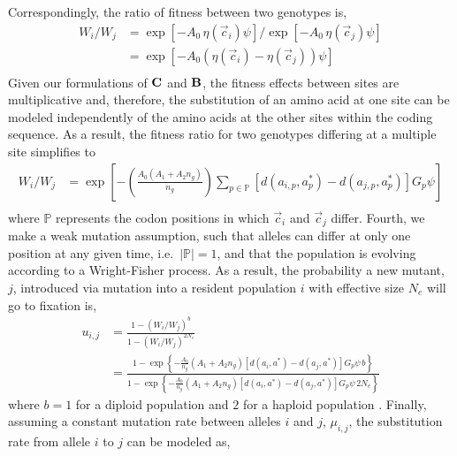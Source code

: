 \documentclass[12pt,letterpaper,fleqn]{article}
\newcommand{\Cost}{\ensuremath{\text{\textbf{C}}}\xspace}
\newcommand{\Func}{\ensuremath{\text{\textbf{B}}}\xspace}
\newcommand{\Ne}{\ensuremath{{N_e}}\xspace} %
\newcommand{\aip}{\ensuremath{a_{i,p}}\xspace}
\newcommand{\ajp}{\ensuremath{a_{j,p}}\xspace}
\newcommand{\aopt}{\ensuremath{a^*}\xspace}
\newcommand{\aoptp}{\ensuremath{a^*_p}\xspace}
\newcommand{\cveci}{\ensuremath{\cvec_i}\xspace}
\newcommand{\cvecj}{\ensuremath{\cvec_j}\xspace}
\newcommand{\cvec}{\ensuremath{\Vec{c}}\xspace}
\newcommand{\muij}{\ensuremath{\mu_{i,j}}\xspace}
\newcommand{\setP}{\ensuremath{\mathbb{P}}\xspace}
\renewcommand{\ng}{\ensuremath{{n_g}}\xspace}
\begin{document}
Correspondingly, the ratio of fitness between two genotypes is,
\begin{align}
  W_i/W_j &=  \exp\left[- A_0 \, \eta(\cveci) \psi\right]/\exp\left[- A_0 \, \eta(\cvecj) \psi\right]\\
  &=  \exp\left[- A_0 \left(\eta(\cveci)- \eta(\cvecj)\right) \psi\right] \label{eq:Wratio}\\
\end{align}
Given our formulations of \Cost and \Func, the fitness effects between sites are multiplicative and, therefore, the substitution of an amino acid at one site can be modeled independently of the amino acids at the other sites within the coding sequence.
As a result, the fitness ratio for two genotypes differing at a multiple site simplifies to
\begin{align*}
  W_i/W_j  &= \exp\left[- \left(\frac{A_0 \left(A_1 + A_2 \ng\right)}{\ng}\right)\sum_{p \in \setP} \left[d\left(\aip,\aoptp\right) - d\left(\ajp,\aoptp\right)\right] G_p \psi \right]\\
\end{align*}
where \setP represents the codon positions in which \cveci and \cvecj differ.
Fourth, we make a weak mutation assumption, such that alleles can differ at only one position at any given time, i.e.~$|\setP| = 1$, and that the population is evolving according to a Wright-Fisher process.
As a result, the probability a new mutant, $j$, introduced via mutation into a resident population $i$ with effective size \Ne will go to fixation is,
\begin{align*}
  u_{i,j} &=  \frac{1 - \left(W_i/W_j\right)^b}{1 - \left(W_i/W_j\right)^{2 \Ne}}\\
   &= \frac{1- \exp\left\{- \frac{A_0}{\ng} \left(A_1 + A_2 \ng\right) \left[d\left(a_i,\aopt\right) - d\left(a_j,\aopt\right)\right] G_p \psi \,  b\right\}}  {1-\exp\left\{- \frac{A_0}{\ng} \left(A_1 + A_2 \ng\right) \left[d\left(a_i,\aopt\right) - d\left(a_j,\aopt\right)\right] G_p \psi \, 2\Ne\right\}}
\end{align*}
where $b=1$ for a diploid population and $2$ for a haploid population \citep{Kimura1962,Wright1969,Iwasa1988,BergAndLassig2003,SellaAndHirsh2005}.
Finally, assuming a constant mutation rate between alleles $i$ and $j$, $\muij$, the substitution rate from allele $i$ to $j$ can be modeled as,
\end{document}
